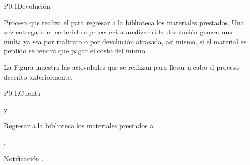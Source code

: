 
\begin{Proceso}{P0.1}{Devolución} {
  

  Proceso que realiza el  para regresar a la biblioteca los materiales prestados. Una vez entregado el material se procederá a 
  analizar si la devolución genera una multa ya sea por maltrato o por devolución atrasada, así mismo, si el material es perdido se tendrá que pagar el 
  costo del mismo.
  

  \noindent La Figura  muestra las actividades que se realizan para llevar a cabo el proceso descrito anteriormente.


} {P0.1:Cuenta}


   { %
      y  
  }

   { %
    Regresar a la biblioteca los materiales prestados al  
  }

   { %
  	\begin{UClist}
     	\UCli  {}.
    \end {UClist}
  }
  
   { %
  }

   { %
    \begin{UClist}
      \UCli Notificación .
    \end{UClist}
  }


\end{Proceso}

